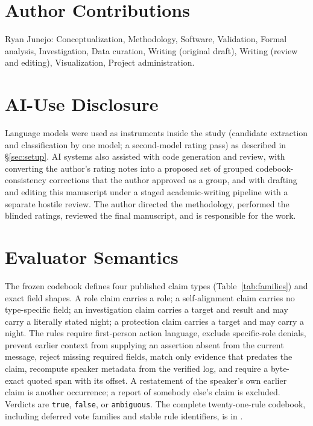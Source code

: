 \documentclass[11pt]{article}
\newcommand{\code}[1]{\texttt{#1}}
\begin{document}
\section*{Author Contributions}
Ryan Junejo: Conceptualization, Methodology, Software, Validation, Formal analysis, Investigation, Data curation, Writing (original draft), Writing (review and editing), Visualization, Project administration.

\section*{AI-Use Disclosure}
Language models were used as instruments inside the study (candidate extraction and classification by one model; a second-model rating pass) as described in \S\ref{sec:setup}. AI systems also assisted with code generation and review, with converting the author's rating notes into a proposed set of grouped codebook-consistency corrections that the author approved as a group, and with drafting and editing this manuscript under a staged academic-writing pipeline with a separate hostile review. The author directed the methodology, performed the blinded ratings, reviewed the final manuscript, and is responsible for the work.




\appendix

\section{Evaluator Semantics}
\label{app:codebook}
The frozen codebook defines four published claim types (Table~\ref{tab:families}) and exact field shapes. A role claim carries a role; a self-alignment claim carries no type-specific field; an investigation claim carries a target and result and may carry a literally stated night; a protection claim carries a target and may carry a night. The rules require first-person action language, exclude specific-role denials, prevent earlier context from supplying an assertion absent from the current message, reject missing required fields, match only evidence that predates the claim, recompute speaker metadata from the verified log, and require a byte-exact quoted span with its offset. A restatement of the speaker's own earlier claim is another occurrence; a report of somebody else's claim is excluded. Verdicts are \code{true}, \code{false}, or \code{ambiguous}. The complete twenty-one-rule codebook, including deferred vote families and stable rule identifiers, is in .
\end{document}
